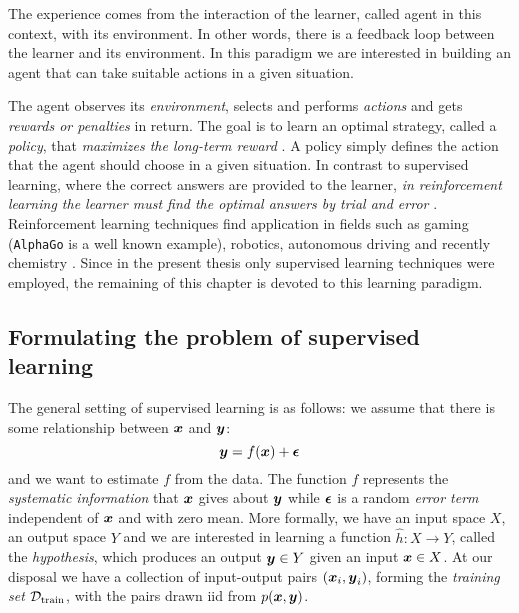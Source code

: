 \begin{definition}
	The experience comes from the interaction of the learner, called
	agent in this context, with its environment. In other words,
	there is a feedback loop between the learner and its environment. In this
	paradigm we are interested in building an agent that can take suitable
	actions in a given situation.
\end{definition}

The agent observes its \emph{environment}, selects and performs \emph{actions}
and gets \emph{rewards or penalties} in return. The goal is to learn an optimal
strategy, called a \emph{policy}, that \emph{maximizes the long-term reward}
\parencite{sklearn}. A policy simply defines the action that the agent should
choose in a given situation. In contrast to supervised learning, where the
correct answers are provided to the learner, \emph{in reinforcement learning the
learner must find the optimal answers by trial and error}
\parencite{bishop2007}. Reinforcement learning techniques find application in
fields such as gaming (\texttt{AlphaGo} is a well known example), robotics,
autonomous driving and recently chemistry \parencite{li, Gow2022}. Since in the
present thesis only supervised learning techniques were employed, the remaining
of this chapter is devoted to this learning paradigm.

\subsection{Formulating the problem of supervised learning}

The general setting of supervised learning is as follows: we assume that there
is some relationship between $\boldsymbol{x}$ and $\boldsymbol{y}$:
\begin{equation}
	\label{eq:supervised}
	\boldsymbol{y} = f(\boldsymbol{x}) + \boldsymbol{\epsilon}
\end{equation}
and we want to estimate $f$ from the data. The function $f$ represents the
\emph{systematic information} that $\boldsymbol{x}$ gives about $\boldsymbol{y}$ while
$\boldsymbol{\epsilon}$ is a random \emph{error term} independent of
$\boldsymbol{x}$ and with zero mean. More formally, we have an input space $X$, an output
space $Y$ and we are interested in learning a function $\hat{h} \colon X \to Y$,
called the \emph{hypothesis}, which produces
an output $\boldsymbol{y} \in Y$ given an input $\boldsymbol{x} \in X$. At our disposal we have a
collection of input-output pairs $(\boldsymbol{x}_i, \boldsymbol{y}_i)$, forming the \emph{training
set} $\mathcal{D}_\text{train}$, with the pairs drawn \acrshort{iid} from
$p(\boldsymbol{x}, \boldsymbol{y})$.

